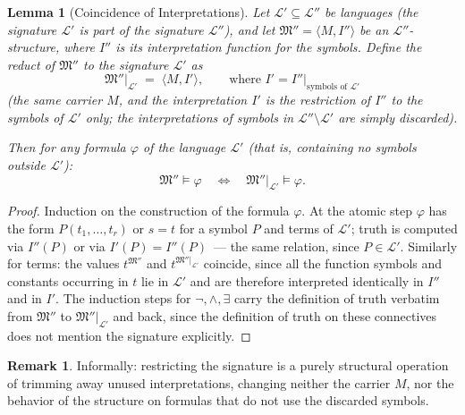\documentclass[12pt, a4paper]{article}
\theoremstyle{plain}
\newtheorem{lemma}[theorem]{Lemma}
\theoremstyle{definition}
\newtheorem{remark}[theorem]{Remark}
\renewcommand{\models}{\vDash}
\newcommand{\Lang}{\mathcal{L}}
\newcommand{\Struct}{\mathfrak{M}}
\newcommand{\tuple}[1]{\langle #1 \rangle}
\begin{document}
\begin{lemma}[Coincidence of Interpretations]\label{lem:reduct}
Let $\Lang' \subseteq \Lang''$ be languages (the signature $\Lang'$ is
part of the signature $\Lang''$), and let
$\Struct'' = \tuple{M, I''}$ be an $\Lang''$-structure, where $I''$ is
its interpretation function for the symbols. Define
the \emph{reduct} of $\Struct''$ to the signature $\Lang'$ as
\[
  \Struct''|_{\Lang'} \;=\; \tuple{M, I'},
  \qquad \text{where } I' = I''\big|_{\text{symbols of } \Lang'}
\]
(the same carrier $M$, and the interpretation $I'$ is the restriction of $I''$
to the symbols of $\Lang'$ only; the interpretations of symbols
in $\Lang'' \setminus \Lang'$ are simply discarded).

Then for any formula $\varphi$ of the language $\Lang'$ (that is, containing no
symbols outside $\Lang'$):
\[
  \Struct'' \models \varphi
  \quad\iff\quad
  \Struct''|_{\Lang'} \models \varphi.
\]
\end{lemma}

\begin{proof}
Induction on the construction of the formula $\varphi$. At the atomic step $\varphi$ has
the form $P(t_1,\ldots,t_r)$ or $s=t$ for a symbol $P$ and terms of $\Lang'$;
truth is computed via $I''(P)$ or via $I'(P) = I''(P)$~---
the same relation, since $P \in \Lang'$. Similarly for terms:
the values $t^{\Struct''}$ and $t^{\Struct''|_{\Lang'}}$ coincide, since
all the function symbols and constants occurring in $t$ lie in $\Lang'$
and are therefore interpreted identically in $I''$ and in $I'$. The induction steps for
$\neg, \wedge, \exists$ carry the definition of truth verbatim from
$\Struct''$ to $\Struct''|_{\Lang'}$ and back, since the
definition of truth on these connectives does not mention the signature explicitly.
\end{proof}

\begin{remark}
Informally: restricting the signature is a purely structural operation
of trimming away unused interpretations, changing neither the carrier $M$,
nor the behavior of the structure on formulas that do not use
the discarded symbols.
\end{remark}
\end{document}
